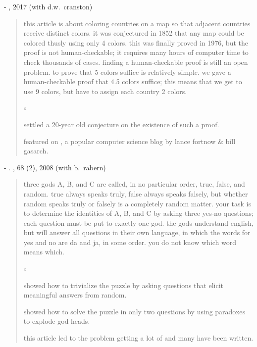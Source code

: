 \documentclass[10pt]{article}
\newcommand{\squishlist}{
   \begin{list}{$\circ$}
    { \setlength{\itemsep}{0pt}    \setlength{\parsep}{0pt}
      \setlength{\topsep}{4.5pt}     \setlength{\partopsep}{0pt}
      \setlength{\leftmargin}{2em} \setlength{\labelwidth}{1.5em}
      \setlength{\labelsep}{0.5em} } }
\newcommand{\squishend}{
    \end{list}  }
\begin{document}
\bigskip
{
- 
\newblock \href{https://landon.github.io/graphdata/Papers/planar%209%20halves.pdf}{\color{the_blue}{planar graphs are $\frac92$-colorable}}
, 2017 (with d.w.~cranston)}
\begin{quote}
\begin{minipage}{17cm}this article is about coloring countries on a map so that adjacent countries receive distinct colors. it was conjectured
in 1852 that any map could be colored thusly using only 4 colors. this was finally proved in 1976, but the proof is not human-checkable;
it requires many hours of computer time to check thousands of cases. finding a human-checkable proof is still an open problem.
to prove that 5 colors suffice is relatively simple.  we gave a human-checkable proof that 4.5 colors suffice; this means that
we get to use 9 colors, but have to assign each country 2 colors.\end{minipage}

\squishlist
	\item settled a 20-year old conjecture on the existence of such a proof.
	\item featured on 
\href{http://blog.computationalcomplexity.org/2015/10/a-human-readable-proof-that-every.html}{\color{the_blue}{computational complexity}}, a popular computer science blog by lance fortnow \& bill gasarch.
\squishend
\end{quote}

{
- \newblock \href{http://brianrabern.net/sshlpe.pdf}{\color{the_blue}{a simple solution to the hardest logic puzzle ever}}. 
, 68 (2), 2008 (with b.~rabern)}

\begin{quote}
\begin{minipage}{17cm} three gods A, B, and C are called, in no particular order, true, false, and random. 
true always speaks truly, false always speaks falsely, but whether random speaks truly or falsely is a completely random matter. 
your task is to determine the identities of A, B, and C by asking three yes-no questions; each question must be put to exactly one god. 
the gods understand english, but will answer all questions in their own language, in which the words for yes and no are da and ja, in some order. 
you do not know which word means which.\end{minipage}

	  \squishlist
		\item showed how to trivialize the puzzle by asking questions that elicit meaningful answers from random.
		\item showed how to solve the puzzle in only two questions by using paradoxes to explode god-heads.
		\item this article led to the problem getting a lot of \href{http://brianrabern.net/New_Scientist_HLPE.pdf}{\color{the_blue}{press}} 
		and many \href{https://scholar.google.com/scholar?oi=bibs&hl=en&cites=14941881349355280851}{\color{the_blue}{follow-up papers}} have been written.
      \squishend
\end{quote}
\end{document}
